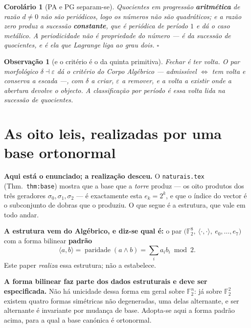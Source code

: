 \documentclass[11pt,a4paper]{article}
\newtheorem{corolario}[teorema]{Corolário}
\newtheorem{observacao}{Observação}
\newcommand{\code}[1]{\texttt{\small #1}}
\begin{document}
\begin{corolario}[PA e PG separam-se]\label{cor:papg}
Quocientes em progressão \textbf{aritmética} de razão $d\neq0$ não são periódicos,
logo os números não são quadráticos; e a razão zero produz a sucessão \textbf{constante},
que é periódica de período $1$ e dá o caso metálico. \emph{A periodicidade não é propriedade do número --- é da
sucessão de quocientes, e é ela que Lagrange liga ao grau dois.} $\square$
\end{corolario}

\begin{observacao}[e o critério é o da quinta primitiva]
Fechar é \emph{ter volta}. O par morfológico $\delta\dashv\varepsilon$ dá o
critério do \emph{Corpo Algébrico} --- \emph{admissível $\iff$ tem volta e conserva
a escada} ---, com $\delta$ a criar, $\varepsilon$ a remover, e a volta a existir
onde a abertura devolve o objecto. A classificação por período é essa volta lida na
sucessão de quocientes.
\end{observacao}

\section{As oito leis, realizadas por uma base ortonormal}\label{sec:orto}

\noindent\textbf{Aqui está o enunciado; a realização desceu.} O
\code{naturais.tex} (Thm.~\code{thm:base}) mostra que a base que a \emph{torre}
produz --- os oito produtos dos três geradores $\sigma_0,\sigma_1,\sigma_2$ ---
é exactamente esta $e_k=2^{k}$, e que o índice do vector é o subconjunto de
dobras que o produziu. O que segue é a estrutura, que vale em todo andar.

\textbf{A estrutura vem do Algébrico, e diz-se qual é:} o par
$\bigl(\mathbb{F}_2^{8},\ \langle\cdot,\cdot\rangle,\ e_0,\ldots,e_7\bigr)$
com a forma bilinear \textbf{padrão}
\[
\langle a,b\rangle=\operatorname{paridade}(a\wedge b)
=\textstyle\sum_i a_ib_i\bmod2 .
\]
Este paper \emph{realiza} essa estrutura; não a estabelece.

\medskip
\noindent\textbf{A forma bilinear faz parte dos dados estruturais e deve ser
especificada.} Não há unicidade dessa forma em geral sobre $\mathbb{F}_2^{n}$: já
sobre $\mathbb{F}_2^{2}$ existem quatro formas simétricas não degeneradas, uma
delas alternante, e ser alternante é invariante por mudança de base. Adopta-se
aqui a forma padrão acima, para a qual a base canónica é ortonormal.
\end{document}
